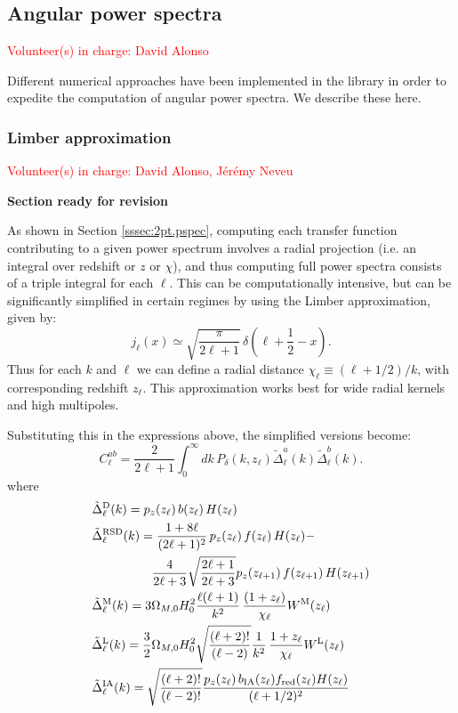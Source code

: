 \documentclass[\docopts]{\docclass}
\newcommand{\vol}[1]{\textcolor{red}{Volunteer(s) in charge: #1}}
\newcommand{\revise}{\textcolor{red!55!blue}{\bf Section ready for revision}}
\begin{document}
\subsection{Angular power spectra}
\vol{David Alonso}

Different numerical approaches have been implemented in the library in order to expedite the computation of angular power spectra. We describe these here.

\subsubsection{Limber approximation}
\vol{David Alonso, J\'er\'emy Neveu}

\revise

As shown in Section \ref{sssec:2pt.pspec}, computing each transfer function contributing to a given power spectrum involves a radial projection (i.e. an integral over redshift or $z$ or $\chi$), and thus computing full power spectra consists of a triple integral for each $\ell$. This can be computationally intensive, but can be significantly simplified in certain regimes by using the Limber approximation, given by:
\begin{equation}
 j_\ell(x)\simeq\sqrt{\frac{\pi}{2\ell+1}}\,\delta\left(\ell+\frac{1}{2}-x\right).
\end{equation}
Thus for each $k$ and $\ell$ we can define a radial distance $\chi_\ell\equiv(\ell+1/2)/k$, with corresponding redshift $z_\ell$. This approximation works best for wide radial kernels and high multipoles.

Substituting this in the expressions above, the simplified versions become:
\begin{equation}\label{eq:limber}
 C^{ab}_\ell=\frac{2}{2\ell+1}\int_0^\infty dk\,P_\delta\left(k,z_\ell\right)
 \tilde{\Delta}^a_\ell(k)\tilde{\Delta}^b_\ell(k).
\end{equation}
where
\begin{align}
 &\tilde{\Delta}_\ell^{\rm D}(k)=p_z(z_\ell)\,b(z_\ell)\,H(z_\ell)\\
 &\tilde{\Delta}_\ell^{\rm RSD}(k)=
 \frac{1+8\ell}{(2\ell+1)^2}\,p_z(z_\ell)\,f(z_\ell)\,H(z_\ell)-\\
 &\hspace{48pt}\frac{4}{2\ell+3}\sqrt{\frac{2\ell+1}{2\ell+3}}p_z(z_{\ell+1})\,f(z_{\ell+1})\,H(z_{\ell+1})\\
 &\tilde{\Delta}_\ell^{\rm M}(k)=3\Omega_{M,0}H_0^2\frac{\ell(\ell+1)}{k^2}\,
 \frac{(1+z_\ell)}{\chi_\ell}W^{\rm M}(z_\ell)\\
 &\tilde{\Delta}_\ell^{\rm L}(k)=\frac{3}{2}\Omega_{M,0}H_0^2\sqrt{\frac{(\ell+2)!}{(\ell-2)}}\frac{1}{k^2}\,
 \frac{1+z_\ell}{\chi_\ell}W^{\rm L}(z_\ell)\\
 &\tilde{\Delta}_\ell^{\rm IA}(k)=\sqrt{\frac{(\ell+2)!}{(\ell-2)!}}\frac{p_z(z_\ell)\,b_{\rm IA}(z_\ell)f_{\rm red}(z_\ell)H(z_\ell)}{(\ell+1/2)^2}
\end{align}
\end{document}
